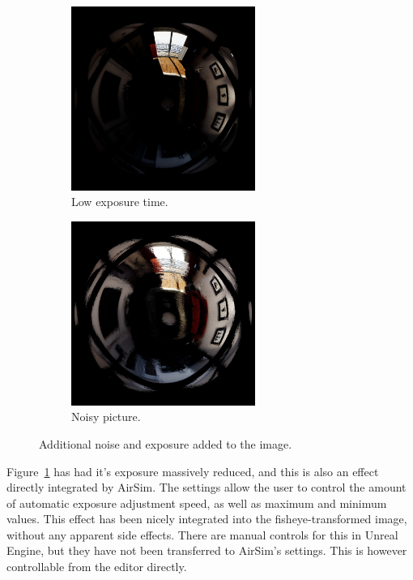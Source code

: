 \begin{figure}[!htb]
    \centering
    \begin{subfigure}{0.45\textwidth}
        \centering
        \includegraphics[height=6cm]{rapport/fig/Results/pp/no_nooise_high_min_brightness.jpeg}
        \caption{Low exposure time.}
        \label{fig:res_pp_exposure_yes}
    \end{subfigure}
    \begin{subfigure}{0.45\textwidth}
        \centering
        \includegraphics[height=6cm]{rapport/fig/Results/pp/noise_normal_exposure.jpeg}
        \caption{Noisy picture.}
        \label{fig:res_pp_noise_yes}
    \end{subfigure}
    \caption{Additional noise and exposure added to the image.}
    \label{fig:res_pp}
\end{figure}

Figure~\ref{fig:res_pp_exposure_yes} has had it's exposure massively reduced, and this is also an effect directly integrated by AirSim. The settings allow the user to control the amount of automatic exposure adjustment speed, as well as maximum and minimum values. This effect has been nicely integrated into the fisheye-transformed image, without any apparent side effects. There are manual controls for this in Unreal Engine, but they have not been transferred to AirSim's settings. This is however controllable from the editor directly.

